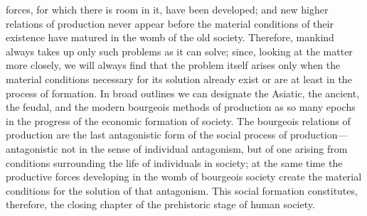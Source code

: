 forces, for which there is room in it, have been developed; and new
higher relations of production never appear before the material
conditions of their existence have matured in the womb of the old
society. Therefore, mankind always takes up only such problems as it
can solve; since, looking at the matter more closely, we will always
 find that the problem itself arises only when the material
conditions necessary for its solution already exist or are at least in
the process of formation. In broad outlines we can designate the
Asiatic, the ancient, the feudal, and the modern bourgeois methods of
production as so many epochs in the progress of the economic formation
of society. The bourgeois relations of production are the last
antagonistic form of the social process of production---antagonistic
not in the sense of individual antagonism, but of one arising from
conditions surrounding the life of individuals in society; at the same
time the productive forces developing in the womb of bourgeois society
create the material conditions for the solution of that antagonism.
This social formation constitutes, therefore, the closing chapter of
the prehistoric stage of human society.

